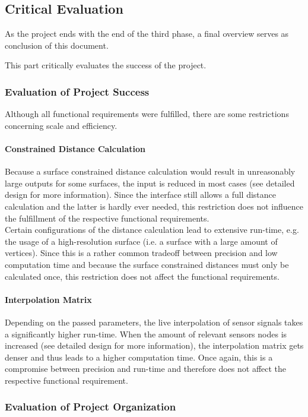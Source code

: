 \subsection{Critical Evaluation}
As the project ends with the end of the third phase, a final overview serves as conclusion of this document.

This part critically evaluates the success of the project.

\subsubsection{Evaluation of Project Success}
Although all functional requirements were fulfilled, there are some restrictions concerning scale and efficiency.

\paragraph{Constrained Distance Calculation}
Because a surface constrained distance calculation would result in unreasonably large outputs for some surfaces, the input is reduced in most cases (see detailed design for more information). Since the interface still allows a full distance calculation and the latter is hardly ever needed, this restriction does not influence the fulfillment of the respective functional requirements.\\
Certain configurations of the distance calculation lead to extensive run-time, e.g. the usage of a high-resolution surface (i.e. a surface with a large amount of vertices). Since this is a rather common tradeoff between precision and low computation time and because the surface constrained distances must only be calculated once, this restriction does not affect the functional requirements.

\paragraph{Interpolation Matrix}
Depending on the passed parameters, the live interpolation of sensor signals takes a significantly higher run-time. When the amount of relevant sensors nodes is increased (see detailed design for more information), the interpolation matrix gets denser and thus leads to a higher computation time. Once again, this is a compromise between precision and run-time and therefore does not affect the respective functional requirement.

\subsubsection{Evaluation of Project Organization}

